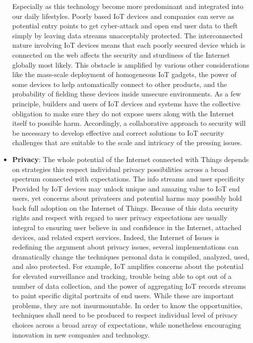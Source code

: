 \begin{itemize}
 	Especially as this technology become more predominant and integrated into our daily lifestyles. Poorly based IoT devices and companies can serve as potential entry points to get cyber-attack and open end user data to theft simply by leaving data streams unacceptably protected. The interconnected nature involving IoT devices means that each poorly secured device which is connected  on the web affects the security and sturdiness of the Internet globally most likely. This obstacle is amplified by various other considerations like the mass-scale deployment of homogeneous IoT gadgets, the power of some devices to help automatically connect to other products, and the probability of fielding these devices inside unsecure environments. As a few principle, builders and users of IoT devices and systems have the collective obligation to make sure they do not expose users along with the Internet itself to possible harm. Accordingly, a collaborative approach to security will be necessary to develop effective and correct solutions to IoT security challenges that are suitable to the scale and intricacy of the pressing issues.
  \item \textbf{Privacy}: The whole potential of the Internet connected with Things depends on strategies this respect individual privacy possibilities across a broad spectrum connected with expectations. The info streams and user specificity
 Provided by IoT devices may unlock unique and amazing value to IoT end users, yet concerns about privateers and potential harms may possibly hold back full adoption on the Internet of Things. Because of this  data security rights and respect with regard to user privacy expectations are usually integral to ensuring user believe in and confidence in the Internet, attached devices, and related expert services. Indeed, the Internet of Issues is redefining the argument about privacy issues, several implementations can dramatically change the techniques personal data is compiled, analyzed, used, and also protected. For example, IoT amplifies concerns about the potential for elevated surveillance and tracking, trouble being able to opt out of a number of data collection, and the power of aggregating IoT records streams to paint specific digital portraits of end users. While these are important problems, they are not insurmountable. In order to know the opportunities, techniques shall need to be produced to respect individual level of privacy choices across a broad array of expectations, while nonetheless encouraging innovation in new companies and technology.


\end{itemize}
